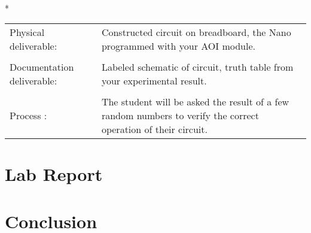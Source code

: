   \vspace{15px}
  \begin{centering}
    \begin{fminipage}{.43\textwidth}
      \vspace{3px}
      \\*
      \vspace{10px}
      \begin{tabular}{p{1.8cm}  p{5.4cm}}
        \raggedright Physical deliverable:           & Constructed circuit on breadboard,  the Nano programmed with your AOI module.\\
        \\
        \raggedright Documentation deliverable:      & Labeled schematic of circuit,  truth table from your  experimental result.\\
        \\
        Process :                                    & The student will be asked the result of a few random numbers to verify the correct operation of their circuit.
      \end{tabular}
    \end{fminipage}
  \end{centering} 

\section{\bfseries  Lab Report}
  
\section{\bfseries  Conclusion}
 


